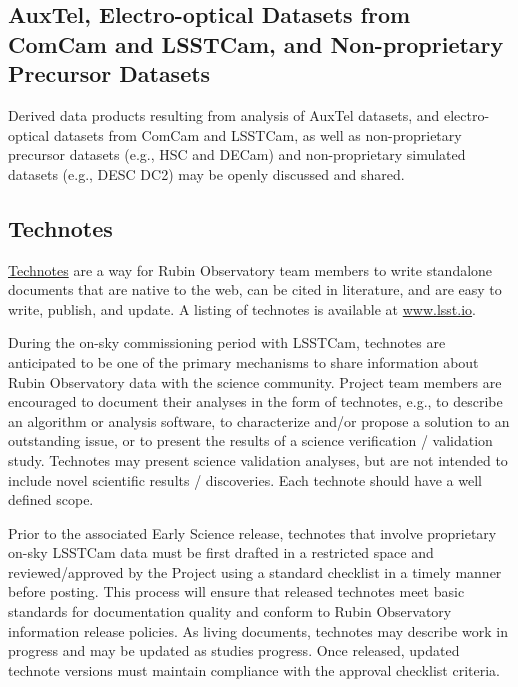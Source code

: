 \documentclass[SE,authoryear,toc,lsstdraft]{lsstdoc}
\begin{document}
\subsection{AuxTel, Electro-optical Datasets from ComCam and LSSTCam, and Non-proprietary Precursor Datasets}

Derived data products resulting from analysis of AuxTel datasets, and electro-optical datasets from ComCam and LSSTCam, as well as non-proprietary precursor datasets (e.g., HSC and DECam) and non-proprietary simulated datasets (e.g., DESC DC2) may be openly discussed and shared.



\subsection{Technotes}
\label{technotes}

\href{https://developer.lsst.io/project-docs/technotes.html}{Technotes} are a way for Rubin Observatory team members to write standalone documents that are native to the web, can be cited in literature, and are easy to write, publish, and update.
A listing of technotes is available at \url{www.lsst.io}.

During the on-sky commissioning period with LSSTCam, technotes are anticipated to be one of the primary mechanisms to share information about Rubin Observatory data with the science community.
Project team members are encouraged to document their analyses in the form of technotes, e.g., to describe an algorithm or analysis software, to characterize and/or propose a solution to an outstanding issue, or to present the results of a science verification / validation study.
Technotes may present science validation analyses, but are not intended to include novel scientific results / discoveries.
Each technote should have a well defined scope.

Prior to the associated Early Science release, technotes that involve proprietary on-sky LSSTCam data must be first drafted in a restricted space and reviewed/approved by the Project using a standard checklist in a timely manner before posting.
This process will ensure that released technotes meet basic standards for documentation quality and conform to Rubin Observatory information release policies.
As living documents, technotes may describe work in progress and may be updated as studies progress.
Once released, updated technote versions must maintain compliance with the approval checklist criteria.
\end{document}
